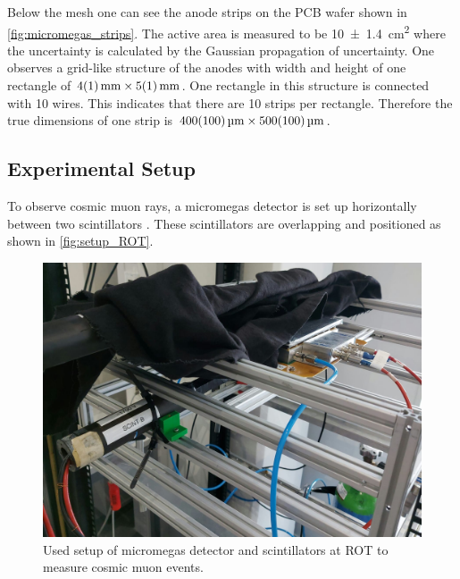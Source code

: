\documentclass[sn-mathphys-num,iicol]{sn-jnl}
\theoremstyle{thmstyleone}
\theoremstyle{thmstyletwo}
\theoremstyle{thmstylethree}
\begin{document}
Below the mesh one can see the anode strips on the PCB wafer shown in \autoref{fig:micromegas_strips}.
The active area is measured to be \SI{10\pm1.4}{\cm^2} where the uncertainty is calculated by the Gaussian propagation of uncertainty.
One observes a grid-like structure of the anodes with width and height of one rectangle of $\SI{4\pm1}{\mm}\times\SI{5\pm1}{\mm}$.
One rectangle in this structure is connected with 10 wires.
This indicates that there are 10 strips per rectangle.
Therefore the true dimensions of one strip is $\SI{400\pm100}{\micro\meter}\times\SI{500\pm100}{\micro\meter}$.


\subsection{Experimental Setup}
To observe cosmic muon rays, a micromegas detector is set up horizontally between two scintillators \cite{Scint}.
These scintillators are overlapping and positioned as shown in \autoref{fig:setup_ROT}.

\begin{figure}
  \includegraphics[width=\linewidth]{figures/setup_ROT.jpeg}
  \caption{Used setup of micromegas detector and scintillators at ROT to measure cosmic muon events.}
  \label{fig:setup_ROT}
\end{figure}
\end{document}
